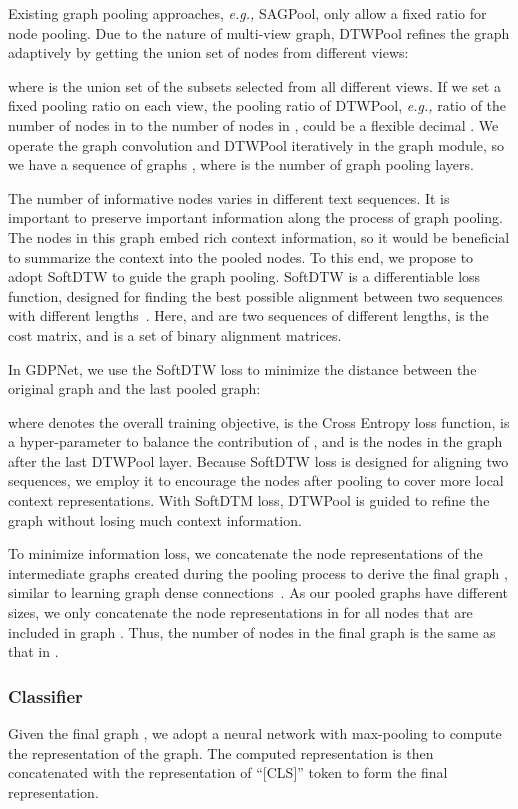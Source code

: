 \documentclass[letterpaper]{article} \usepackage{aaai21}  \usepackage{times}  \usepackage{helvet} \usepackage{courier}  \usepackage[hyphens]{url}  \usepackage{graphicx} \urlstyle{rm} \def\UrlFont{\rm}  \usepackage{graphicx}  \usepackage{natbib}  \usepackage{caption}
\newcommand{\eg}{\emph{e.g.,}\xspace}
\begin{document}
Existing graph pooling approaches, \eg SAGPool, only allow a fixed ratio for node pooling. Due to the nature of multi-view graph, DTWPool refines the graph adaptively by getting the union set of nodes from different views:


where  is the union set of the subsets selected from all different views. If we set a fixed pooling ratio  on each view, the pooling ratio of DTWPool, \eg ratio of the number of nodes in  to the number of nodes in , could be a flexible decimal . We operate the graph convolution and DTWPool iteratively in the graph module, so we have a sequence of graphs , where  is the number of graph pooling layers. 

 

The number of informative nodes varies in different text sequences. It is important to preserve important information along the process of graph pooling. The nodes in this graph embed rich context information, so it would be beneficial to summarize the context into the pooled nodes. To this end, we propose to adopt SoftDTW to guide the graph pooling. SoftDTW is a differentiable loss function, designed for finding the best possible alignment between two sequences with different lengths~\cite{cuturi2017soft}.  
Here,  and  are two sequences of different lengths,  is the cost matrix, and  is a set of binary alignment matrices. 


In GDPNet, we use the SoftDTW loss to minimize the distance between the original graph and the last pooled graph:

where  denotes the overall training objective,  is the Cross Entropy loss function,  is a hyper-parameter to balance the contribution of , and  is the nodes in the graph after the last DTWPool layer. Because SoftDTW loss is designed for aligning two sequences, we employ it to encourage the nodes after pooling to cover more local context representations. With SoftDTM loss, DTWPool is guided to refine the graph without losing much context information.

To minimize information loss, we concatenate the node representations of the intermediate graphs created during the pooling process to derive the final graph , similar to learning graph dense connections~\cite{guo2019densely}. As our pooled graphs have different sizes, we only concatenate the node representations in  for all nodes that are included in graph . Thus, the number of nodes in the final graph  is the same as that in . 

\subsubsection{Classifier}
Given the final graph , we adopt a neural network with max-pooling to compute the representation of the graph. The computed representation is then concatenated with the representation of ``[CLS]'' token  to form the final representation.
\end{document}
